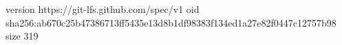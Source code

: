 version https://git-lfs.github.com/spec/v1
oid sha256:ab670c25b47386713ff5435e13d8b1df98383f134ed1a27e82f0447c12757b98
size 319
